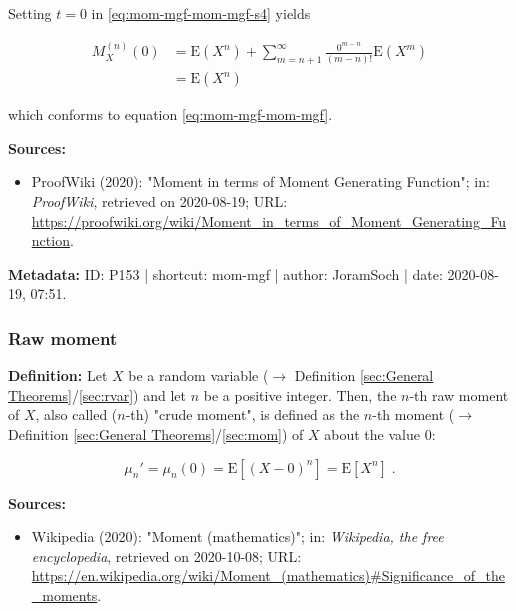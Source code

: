 \documentclass[a4paper,12pt,twoside]{book}
\begin{document}
Setting $t = 0$ in \eqref{eq:mom-mgf-mom-mgf-s4} yields

\begin{equation} \label{eq:mom-mgf-mom-mgf-s5}
\begin{split}
M_X^{(n)}(0) &= \mathrm{E}\left( X^n \right) + \sum_{m=n+1}^\infty \frac{0^{m-n}}{(m-n)!} \mathrm{E}\left( X^m \right) \\
&= \mathrm{E}\left( X^n \right)
\end{split}
\end{equation}

which conforms to equation \eqref{eq:mom-mgf-mom-mgf}.


\vspace{1em}
\textbf{Sources:}
\begin{itemize}
\item ProofWiki (2020): "Moment in terms of Moment Generating Function"; in: \textit{ProofWiki}, retrieved on 2020-08-19; URL: \url{https://proofwiki.org/wiki/Moment_in_terms_of_Moment_Generating_Function}.
\end{itemize}


\vspace{1em}
\textbf{Metadata:} ID: P153 | shortcut: mom-mgf | author: JoramSoch | date: 2020-08-19, 07:51.
\vspace{1em}



\subsubsection[\textit{Raw moment}]{Raw moment} \label{sec:mom-raw}
\setcounter{equation}{0}

\textbf{Definition:} Let $X$ be a random variable ($\rightarrow$ Definition \ref{sec:General Theorems}/\ref{sec:rvar}) and let $n$ be a positive integer. Then, the $n$-th raw moment of $X$, also called ($n$-th) "crude moment", is defined as the $n$-th moment ($\rightarrow$ Definition \ref{sec:General Theorems}/\ref{sec:mom}) of $X$ about the value 0:

\begin{equation} \label{eq:mom-raw-mom-raw}
\mu_n' = \mu_n(0) = \mathrm{E}[(X-0)^n] = \mathrm{E}[X^n] \; .
\end{equation}


\vspace{1em}
\textbf{Sources:}
\begin{itemize}
\item Wikipedia (2020): "Moment (mathematics)"; in: \textit{Wikipedia, the free encyclopedia}, retrieved on 2020-10-08; URL: \url{https://en.wikipedia.org/wiki/Moment_(mathematics)#Significance_of_the_moments}.
\end{itemize}
\end{document}
